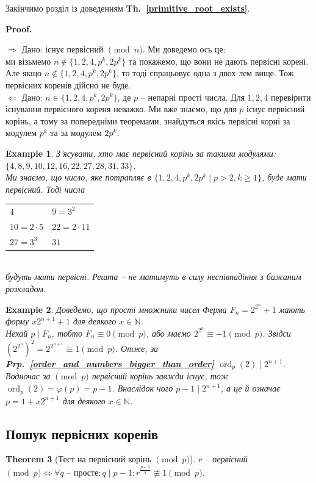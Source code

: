 \documentclass[a4paper, 10pt]{article}
\makeatletter
\theoremstyle{theoremdd}
\newtheorem{theorem}{Theorem}[subsection]
\theoremstyle{theoremdd}
\theoremstyle{theoremdd}
\theoremstyle{theoremdd}
\newtheorem{example}[theorem]{Example}
\theoremstyle{theoremdd}
\theoremstyle{theoremdd}
\theoremstyle{theoremdd}
\theoremstyle{theoremdd}
\def\rightproof{$\boxed{\Rightarrow}$ }
\def\leftproof{$\boxed{\Leftarrow}$ }
\renewenvironment{proof}[1][Proof.\\]{\par
\pushQED{\hfill \qed}%
\normalfont \topsep6\p@\@plus6\p@\relax
\trivlist
\item\relax
{\bfseries
#1\@addpunct{.}}\hspace\labelsep\ignorespaces
}{%
\popQED\endtrivlist\@endpefalse
}
\DeclareMathOperator{\ord}{ord}
\newcommand\thref[1]{\textbf{Th.~\ref{#1}}}
\newcommand\prpref[1]{\textbf{Prp.~\ref{#1}}}
\makeatother
\begin{document}
Закінчимо розділ із доведенням \thref{primitive_root_exists}.

\begin{proof}
\rightproof Дано: існує первісний $\!\! \pmod n$. Ми доведемо ось це:\\
ми візьмемо $n \not\in \{1,2,4,p^k,2p^k\}$ та покажемо, що вони не дають первісні корені. Але якщо $n \not \in \{1,2,4,p^k,2p^k\}$, то тоді спрацьовує одна з двох лем вище. Тож первісних коренів дійсно не буде.
\bigskip \\
\leftproof Дано: $n \in \{1,2,4,p^k,2p^k\}$, де $p$ -- непарні прості числа. Для $1,2,4$ перевірити існування первісного кореня неважко. Ми вже знаємо, що для $p$ існує первісний корінь, а тому за попередніми теоремами, знайдуться якісь первісні корні за модулем $p^k$ та за модулем $2p^k$.
\end{proof}

\begin{example}
З'ясувати, хто має первісний корінь за такими модулями: $\{4,8,9,10,12,16,22,27,28,31,33\}$.\\
Ми знаємо, що число, яке потрапляє в $\{1,2,4,p^k,2p^k \mid p > 2, k \geq 1\}$, буде мати первісний. Тоді числа\\
\begin{tabular}{ll}
$4$ & $9 = 3^2$\\
$10 = 2 \cdot 5$ & $22 = 2 \cdot 11$\\
$27 = 3^3$ & $31$
\end{tabular}\\
будуть мати первісні. Решта -- не матимуть в силу неспівпадіння з бажаним розкладом.
\end{example}

\begin{example}
Доведемо, що прості множники чисел Ферма $F_n = 2^{2^n} + 1$ мають форму $x 2^{n+1} +1$ для деякого $x \in \mathbb{N}$.\\
Нехай $p \mid F_n$, тобто $F_n \equiv 0 \pmod p$, або маємо $2^{2^n} \equiv -1 \pmod p$. Звідси $(2^{2^n})^2 = 2^{2^{n+1}} \equiv 1 \pmod p$. Отже, за \prpref{order_and_numbers_bigger_than_order} $\ord_p(2) \mid 2^{n+1}$. Водночас за $\!\! \pmod p$ первісний корінь завжди існує, тож $\ord_p(2) = \varphi(p) = p-1$. Внаслідок чого $p -1 \mid 2^{n+1}$, а це й означає $p = 1 + x 2^{n+1}$ для деякого $x \in \mathbb{N}$.
\end{example}

\subsection{Пошук первісних коренів}
\begin{theorem}[Тест на первісний корінь $\!\! \pmod p$]
$r$ -- первісний $\!\! \pmod p \iff \forall q \text{ -- просте}: q \mid p-1: r^{\frac{p-1}{q}} \not\equiv 1 \pmod p$.
\end{theorem}
\end{document}
